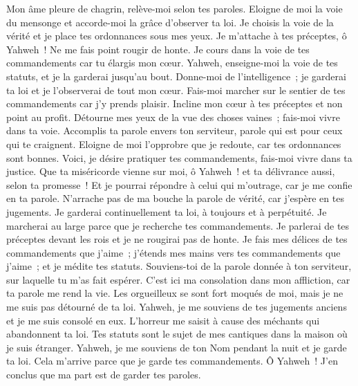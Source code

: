 \begin{multicols}{2}
Mon âme pleure de chagrin, relève-moi selon tes paroles.
Eloigne de moi la voie du mensonge et accorde-moi la grâce d'observer ta loi.
Je choisis la voie de la vérité et je place tes ordonnances sous mes yeux.
Je m'attache à tes préceptes, ô Yahweh~! Ne me fais point rougir de honte.
Je cours dans la voie de tes commandements car tu élargis mon cœur.
 Yahweh, enseigne-moi la voie de tes statuts, et je la garderai jusqu'au bout.
Donne-moi de l'intelligence~; je garderai ta loi et je l'observerai de tout mon cœur.
Fais-moi marcher sur le sentier de tes commandements car j'y prends plaisir.
Incline mon cœur à tes préceptes et non point au profit.
Détourne mes yeux de la vue des choses vaines~; fais-moi vivre dans ta voie.
Accomplis ta parole envers ton serviteur, parole qui est pour ceux qui te craignent.
Eloigne de moi l'opprobre que je redoute, car tes ordonnances sont bonnes.
Voici, je désire pratiquer tes commandements, fais-moi vivre dans ta justice.
 Que ta miséricorde vienne sur moi, ô Yahweh~! et ta délivrance aussi, selon ta promesse~!
Et je pourrai répondre à celui qui m'outrage, car je me confie en ta parole.
N'arrache pas de ma bouche la parole de vérité, car j'espère en tes jugements.
Je garderai continuellement ta loi, à toujours et à perpétuité.
Je marcherai au large parce que je recherche tes commandements.
Je parlerai de tes préceptes devant les rois et je ne rougirai pas de honte.
Je fais mes délices de tes commandements que j'aime~;
j'étends mes mains vers tes commandements que j'aime~; et je médite tes statuts.
 Souviens-toi de la parole donnée à ton serviteur, sur laquelle tu m'as fait espérer.
C'est ici ma consolation dans mon affliction, car ta parole me rend la vie.
Les orgueilleux se sont fort moqués de moi, mais je ne me suis pas détourné de ta loi.
Yahweh, je me souviens de tes jugements anciens et je me suis consolé en eux.
L'horreur me saisit à cause des méchants qui abandonnent ta loi.
Tes statuts sont le sujet de mes cantiques dans la maison où je suis étranger.
Yahweh, je me souviens de ton Nom pendant la nuit et je garde ta loi.
Cela m'arrive parce que je garde tes commandements.
 Ô Yahweh~! J'en conclus que ma part est de garder tes paroles.

\end{multicols}
